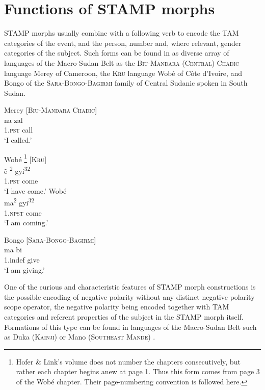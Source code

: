 \documentclass[output=paper]{langsci/langscibook}
\begin{document}
\section{Functions of STAMP morphs}\label{sec:Anderson:3}

STAMP morphs usually combine with a following verb to encode the TAM categories of the event, and the person, number and, where relevant, gender categories of the subject. Such forms can be found in as diverse array of languages of the Macro-Sudan Belt as the \textsc{Biu-Mandara (Central) Chadic} language Merey  of Cameroon, the \textsc{Kru} language Wobé  of Côte d'Ivoire, and Bongo of the \textsc{Sara-Bongo-Bagirmi} family of Central Sudanic  spoken in South Sudan.

\ea\label{ex:anderson:3}
Merey  \citep[8]{Gravina2007}                  \textsc{[Biu-Mandara Chadic]}\\
\gll na  zal    \\
\textsc{1.pst}  call   \\
\glt `I called.'  
\z


\ea\label{ex:anderson:4}
\ea\label{ex:anderson:4a}
Wobé \citep[Wobé 3]{HoferLink1973}\footnote{Hofer \& Link's volume does not number the chapters consecutively, but rather each chapter begins anew at page 1. Thus this form comes from page 3 of the Wobé chapter. Their page-numbering convention is followed here.}    \textsc{[Kru]}\\
\gll ẽ\textsuperscript{ 2}    gyi\textsuperscript{32}            \\
1.\textsc{pst}  come  \\
\glt `I have come.'            
\ex \label{ex:anderson:4b}
Wobé\\
\gll  ma\textsuperscript{2}  gyi\textsuperscript{32}\\
1.\textsc{npst}  come\\
\glt `I am coming.'  
\z
\z

\ea\label{ex:anderson:5}
Bongo   \citep[75]{TuckerBryan1966}       [\textsc{Sara-Bongo-Bagirmi}]\\
\gll ma    bi\\
1.indef  give  \\
\glt `I am giving.'
\z

One of the curious and characteristic features of STAMP morph constructions is the possible encoding of negative polarity without any distinct negative polarity scope operator, the negative polarity being encoded together with TAM categories and referent properties of the subject in the STAMP morph itself. Formations of this type can be found in languages of the Macro-Sudan Belt such as Duka (\textsc{Kainji})  or Mano (\textsc{Southeast Mande}) . 
\end{document}
